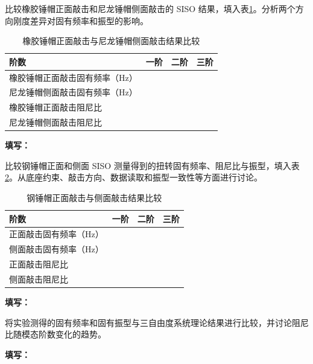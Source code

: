 \documentclass[UTF8,a4paper,12pt]{ctexart}
\newcommand{\blank}[1][2.5cm]{\mbox{\underline{\hspace{#1}}}}
\newcommand{\answer}{\par\noindent\textbf{填写：}\blank[0.86\textwidth]\par}
\numberwithin{equation}{section}
\begin{document}
比较橡胶锤帽正面敲击和尼龙锤帽侧面敲击的 SISO 结果，填入表\ref{tab:exp4-compare-rubber-nylon}。分析两个方向刚度差异对固有频率和振型的影响。

\begin{table}[H]
\centering
\caption{橡胶锤帽正面敲击与尼龙锤帽侧面敲击结果比较}
\label{tab:exp4-compare-rubber-nylon}
\begin{tabular}{lccc}
\toprule
阶数 & 一阶 & 二阶 & 三阶\\
\midrule
橡胶锤帽正面敲击固有频率（Hz） & \blank[1.4cm] & \blank[1.4cm] & \blank[1.4cm]\\
尼龙锤帽侧面敲击固有频率（Hz） & \blank[1.4cm] & \blank[1.4cm] & \blank[1.4cm]\\
橡胶锤帽正面敲击阻尼比 & \blank[1.4cm] & \blank[1.4cm] & \blank[1.4cm]\\
尼龙锤帽侧面敲击阻尼比 & \blank[1.4cm] & \blank[1.4cm] & \blank[1.4cm]\\
\bottomrule
\end{tabular}
\end{table}
\answer

比较钢锤帽正面和侧面 SISO 测量得到的扭转固有频率、阻尼比与振型，填入表\ref{tab:exp4-compare-steel}。从底座约束、敲击方向、数据读取和振型一致性等方面进行讨论。

\begin{table}[H]
\centering
\caption{钢锤帽正面敲击与侧面敲击结果比较}
\label{tab:exp4-compare-steel}
\begin{tabular}{lccc}
\toprule
阶数 & 一阶 & 二阶 & 三阶\\
\midrule
正面敲击固有频率（Hz） & \blank[1.6cm] & \blank[1.6cm] & \blank[1.6cm]\\
侧面敲击固有频率（Hz） & \blank[1.6cm] & \blank[1.6cm] & \blank[1.6cm]\\
正面敲击阻尼比 & \blank[1.6cm] & \blank[1.6cm] & \blank[1.6cm]\\
侧面敲击阻尼比 & \blank[1.6cm] & \blank[1.6cm] & \blank[1.6cm]\\
\bottomrule
\end{tabular}
\end{table}
\answer

将实验测得的固有频率和固有振型与三自由度系统理论结果进行比较，并讨论阻尼比随模态阶数变化的趋势。
\answer
\end{document}
